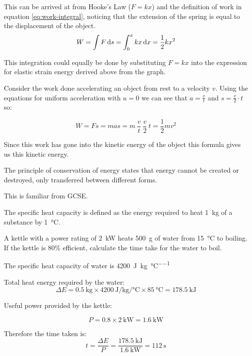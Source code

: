 \documentclass[revision-guide.tex]{subfiles}
\begin{document}

This can be arrived at from Hooke's Law ($F=kx$) and the definition of work in equation \ref{eq:work-integral}, noticing that the extension of the spring is equal to the displacement of the object.
\[ W = \int F \,\mathrm{d} s = \int_0^x kx \,\mathrm{d} x = \frac{1}{2}kx^2 \]

This integration could equally be done by substituting $F=kx$ into the expression for elastic strain energy derived above from the graph.


Consider the work done accelerating an object from rest to a velocity $v$. Using the equations for uniform acceleration with $u=0$ we can see that $ a = \frac{v}{t} $ and $ s = \frac{v}{2}\cdot t $ so:

\[ W = Fs = mas = m\ \frac{v}{t}\ \frac{v}{2}\ t = \frac{1}{2}mv^2 \]

Since this work has gone into the kinetic energy of the object this formula gives us this kinetic energy.


The principle of conservation of energy states that energy cannot be created or destroyed, only transferred between different forms.


This is familiar from GCSE.


The specific heat capacity is defined as the energy required to heat \SI{1}{\kilo\gram} of a substance by \SI{1}{\celsius}.

\begin{example}
  A kettle with a power rating of \SI{2}{\kilo\watt} heats \SI{500}{\gram} of water from \SI{15}{\celsius} to boiling. If the kettle is 80\% efficient, calculate the time take for the water to boil.

  The specific heat capacity of water is \SI{4200}{\joule\per\kilogram\per\celsius}

  \answer

  Total heat energy required by the water:
  \[ \Delta E = \SI{0.5}{\kilogram} \times \SI{4200}{\joule\per\kilogram\per\celsius} \times \SI{85}{\celsius} = \SI{178.5}{\kilo\joule} \]

  Useful power provided by the kettle:

  \[ P = 0.8 \times \SI{2}{\kilo\watt} = \SI{1.6}{\kilo\watt} \]

  Therefore the time taken is:
  \[ t = \frac{\Delta E}{P} = \frac{\SI{178.5}{\kilo\joule}}{\SI{1.6}{\kilo\watt}} = \SI{112}{\second} \]

\end{example}
\end{document}
